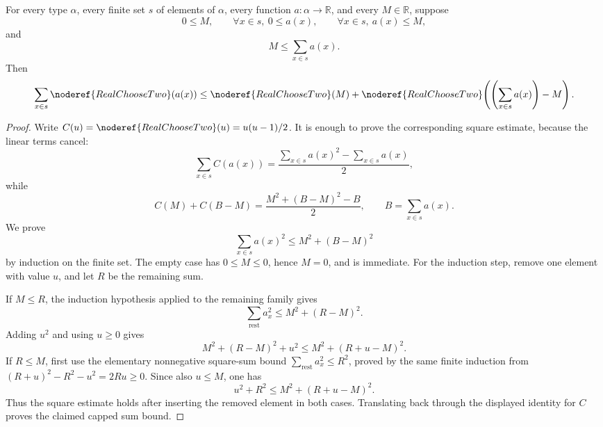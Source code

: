 \begin{helper}
For every type \(\alpha\), every finite set \(s\) of elements of \(\alpha\),
every function \(a:\alpha\to\mathbb R\), and every \(M\in\mathbb R\), suppose
\[
0\le M,
\qquad
\forall x\in s,\ 0\le a(x),
\qquad
\forall x\in s,\ a(x)\le M,
\]
and
\[
M\le \sum_{x\in s}a(x).
\]
Then
\[
\sum_{x\in s}\noderef{RealChooseTwo}(a(x))
\le
\noderef{RealChooseTwo}(M)+
\noderef{RealChooseTwo}\!\left(\left(\sum_{x\in s}a(x)\right)-M\right).
\]
\end{helper}
\begin{proof}
Write \(C(u)=\noderef{RealChooseTwo}(u)=u(u-1)/2\).  It is enough to prove
the corresponding square estimate, because the linear terms cancel:
\[
\sum_{x\in s} C(a(x))
=\frac{\sum_{x\in s} a(x)^2-\sum_{x\in s} a(x)}{2},
\]
while
\[
C(M)+C(B-M)=\frac{M^2+(B-M)^2-B}{2},
\qquad B=\sum_{x\in s}a(x).
\]
We prove
\[
\sum_{x\in s}a(x)^2\le M^2+(B-M)^2
\]
by induction on the finite set.  The empty case has \(0\le M\le0\), hence
\(M=0\), and is immediate.  For the induction step, remove one element with
value \(u\), and let \(R\) be the remaining sum.

If \(M\le R\), the induction hypothesis applied to the remaining family gives
\[
\sum_{\mathrm{rest}}a_x^2\le M^2+(R-M)^2.
\]
Adding \(u^2\) and using \(u\ge0\) gives
\[
M^2+(R-M)^2+u^2
\le M^2+(R+u-M)^2.
\]
If \(R\le M\), first use the elementary nonnegative square-sum bound
\(\sum_{\mathrm{rest}}a_x^2\le R^2\), proved by the same finite induction from
\((R+u)^2-R^2-u^2=2Ru\ge0\).  Since also \(u\le M\), one has
\[
u^2+R^2\le M^2+(R+u-M)^2.
\]
Thus the square estimate holds after inserting the removed element in both
cases.  Translating back through the displayed identity for \(C\) proves the
claimed capped sum bound.
\end{proof}
